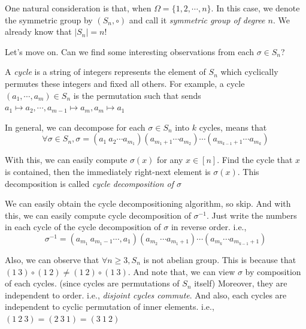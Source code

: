 \documentclass[12pt, a4paper, openany, twoside]{book}
\theoremstyle{definition}
\theoremstyle{remark}
\theoremstyle{plain}
\numberwithin{equation}{section}
\begin{document}
One natural consideration is that, when $\Omega = \{1, 2, \cdots, n\}$. In this case, we denote the symmetric group by $(S_n, \circ)$ 
and call it \textit{symmetric group of degree $n$}. We already know that $|S_n| = n!$ 

Let's move on. Can we find some interesting observations from each $\sigma \in S_n$? 

\begin{tcolorbox}[colback=yellow!10!white,colframe=brown!75!black,title=Cycle decomposition]

A \textit{cycle} is a string of integers represents the element of $S_n$ which cyclically permutes these integers and fixed all others. For example, a cycle 
$(a_1, \cdots, a_m) \in S_n$ is the permutation such that sends $a_1 \mapsto a_2, \cdots, a_{m-1} \mapsto a_m, a_m \mapsto a_1$ 

In general, we can decompose for each $\sigma \in S_n$ into $k$ cycles, means that 
\[\forall \sigma \in S_n, \sigma = (a_1~a_2\cdots a_{m_1})(a_{m_1 + 1}\cdots a_{m_2})\cdots(a_{m_{k-1} + 1} \cdots a_{m_k})\]

With this, we can easily compute $\sigma(x)$ for any $x \in [n]$. Find the cycle that $x$ is contained, then the immediately right-next element is $\sigma(x)$. 
This decomposition is called \textit{cycle decomposition of $\sigma$}

\end{tcolorbox}

We can easily obtain the cycle decompositioning algorithm, so skip. And with this, we can easily compute cycle decomposition of $\sigma^{-1}$. 
Just write the numbers in each cycle of the cycle decomposition of $\sigma$ in reverse order. i.e., 
\[\sigma^{-1} = (a_{m_1}~ a_{m_1 - 1} \cdots, a_1) (a_{m_2}~\cdots a_{m_1 + 1})\cdots (a_{m_k} \cdots a_{m_{k-1} + 1})\]

Also, we can observe that $\forall n \geq 3, S_n$ is not abelian group. This is because that $(1~3)\circ(1~2) \neq (1~2)\circ (1~3)$. 
And note that, we can view $\sigma$ by composition of each cycles. (since cycles are permutations of $S_n$ itself) 
Moreover, they are independent to order. i.e., \textit{disjoint cycles commute}. And also, each cycles are independent to cyclic permutation of inner elements. i.e., $(1~2~3) = (2~3~1) = (3~1~2)$
\end{document}
